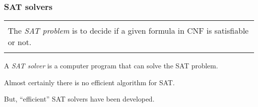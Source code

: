 \documentclass{beamer}
\begin{document}
\begin{frame}
\frametitle{SAT solvers}

\begin{center}
\begin{tabular}
  {|@{\hspace*{1em}}p{}@{\hspace*{1em}}|}
  \hline\\
The \emph{SAT problem} is to decide if a given formula in CNF is satisfiable or not.\\\\\hline
\end{tabular} 
\end{center}

\pause

\bigskip

A \emph{SAT solver} is a computer program that can solve the SAT problem.

\pause

\bigskip

Almost certainly there is no efficient algorithm for SAT.

\bigskip

But, ``efficient'' SAT solvers have been developed.

\end{frame}

\end{document}
